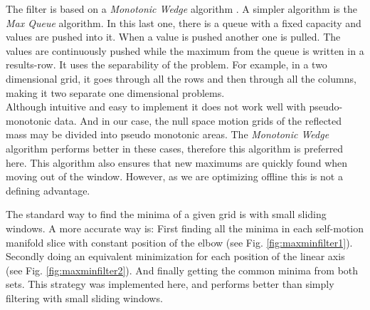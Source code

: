 The filter is based on a \textit{Monotonic Wedge} algorithm \cite{Lemire}.
A simpler algorithm is the \textit{Max Queue} algorithm. In this last one, there is a queue with a fixed capacity and values are pushed into it. When a value is pushed another one is pulled. The values are continuously pushed while the maximum from the queue is written in a results-row.
It uses the separability of the problem.  For example, in a two dimensional grid, it goes through all the rows and then through all the columns, making it two separate one dimensional problems.\\
%
Although intuitive and easy to implement it does not work well with pseudo-monotonic data. And in our case, the null space motion grids of the reflected mass may be divided into pseudo monotonic areas. The \textit{Monotonic Wedge} algorithm performs better in these cases, therefore this algorithm is preferred here. This algorithm also ensures that new maximums are quickly found when moving out of the window. However, as we are optimizing offline this is not a defining advantage.






The standard way to find the minima of a given grid is with small sliding windows. A more accurate way is: First finding all the minima in each self-motion manifold slice with constant position of the elbow (see Fig. \ref{fig:maxminfilter1}). Secondly doing an equivalent minimization for each position of the linear axis (see Fig. \ref{fig:maxminfilter2}). 
And finally getting the common minima from both sets. This strategy was implemented here, and performs better than simply filtering with small sliding windows. 

